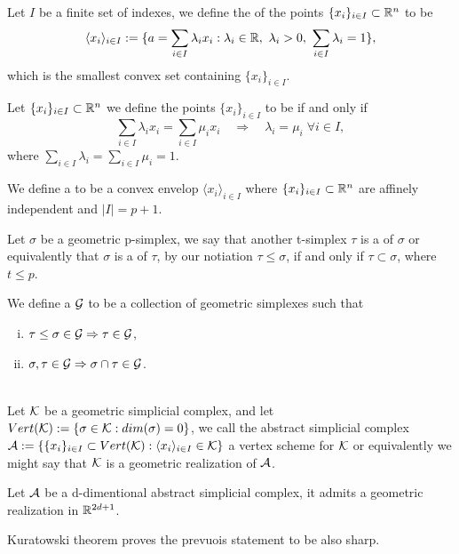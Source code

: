 \documentclass[../1.tex]{subfiles}
\begin{document}
    \begin{defn}
        Let $I$ be a finite set of indexes, we define the  of the points $\{x_i\}_{i \in I} \subset \mathbb{R}^n$ to be 
        \[ \langle x_i \rangle_{i \in I} := \{ a = \sum_{i \in I} \lambda_i x_i : \lambda_i \in \mathbb{R},\ \lambda_i > 0,\  \sum_{i \in I} \lambda_i = 1 \},\]
        which is the smallest convex set containing $\{x_i\}_{i \in I}$.
    \end{defn}

    \begin{defn}
        Let $\{x_i\}_{i \in I} \subset \mathbb{R}^n$ we define the points $\{x_i\}_{i \in I}$ to be  if and only if
        \[ \sum_{i \in I} \lambda_i x_i = \sum_{i \in I} \mu_i x_i \quad \Rightarrow \quad 
        \lambda_i = \mu_i \; \forall i \in I ,\]
        where $\sum_{i \in I} \lambda_i = \sum_{i \in I} \mu_i = 1$.
    \end{defn}

    \begin{defn}
        We define a  to be a convex envelop $\langle x_i \rangle_{i \in I}$
        where $\{x_i\}_{i \in I} \subset \mathbb{R}^n$ are affinely independent and $|I| = p + 1$.
    \end{defn}
    
    \begin{defn}
        Let $\sigma$ be a geometric p-simplex, we say that another t-simplex $\tau$ is a  of $\sigma$ or equivalently 
        that $\sigma$ is a  of $\tau$, by our notiation $\tau \leq \sigma$, if and only if $\tau \subset \sigma$, where $t \leq p$.
    \end{defn}

    \begin{defn}
        We define a  $\mathcal{G}$ to be a collection of geometric simplexes such that
        \begin{enumerate}[(i)]
            \item $ \tau \leq \sigma \in \mathcal{G} \Rightarrow \tau \in \mathcal{G} $,
            \item $ \sigma, \tau \in \mathcal{G} \Rightarrow \sigma \cap \tau \in \mathcal{G}  $.
        \end{enumerate}
    \end{defn}

    \begin{defn}
        \\
        Let $\mathcal{K}$ be a geometric simplicial complex, and let $Vert(\mathcal{K}) := \{\sigma \in \mathcal{K} : dim(\sigma) = 0\}$, we call
        the abstract simplicial complex $\mathcal{A} := \{ \{x_i\}_{i \in I} \subset Vert(\mathcal{K}) : \langle x_i \rangle_{i \in I} \in \mathcal{K} \}$
        a vertex scheme for $\mathcal{K}$ or equivalently we might say that $\mathcal{K}$ is a geometric realization of $\mathcal{A}$.
    \end{defn}
    \begin{thm}
        Let $\mathcal{A}$ be a d-dimentional abstract simplicial complex, it admits a geometric realization in $\mathbb{R}^{2d+1}$.
    \end{thm}
    Kuratowski theorem proves the prevuois statement to be also sharp.
\end{document}
